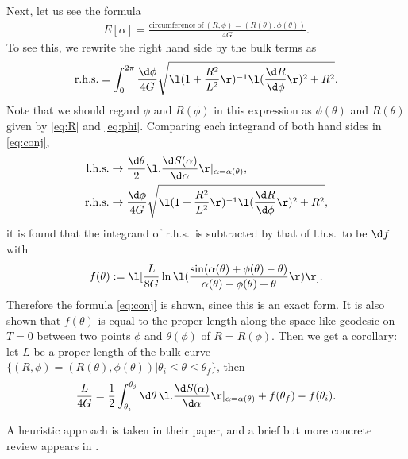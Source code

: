 \documentclass[12pt]{article}
\begin{document}
Next, let us see the formula
\begin{align}
	E[\alpha] = \frac{\mathrm{circumference~of~}(R,\phi) = (R(\theta),\phi(\theta))}{4G}.\label{eq:conj}
\end{align}
To see this, we rewrite the right hand side by the bulk terms as
\begin{align}
	\mathrm{r.h.s.} = \int_0^{2\pi} \frac{\d\phi}{4G}\sqrt{\l(1 + \frac{R^2}{L^2}\r)^{-1}\l(\frac{\d R}{\d \phi}\r)^2 + R^2}.
\end{align}
Note that we should regard $\phi$ and $R(\phi)$ in this expression as $\phi(\theta)$ and $R(\theta)$ given by \eqref{eq:R} and \eqref{eq:phi}.
Comparing each integrand of both hand sides in \eqref{eq:conj},
\begin{align}
	\mathrm{l.h.s.} &\rightarrow \frac{\d\theta}{2}\l.\frac{\d S(\alpha)}{\d\alpha}\r|_{\alpha = \alpha(\theta)},\\
	\mathrm{r.h.s.} &\rightarrow \frac{\d\phi}{4G}\sqrt{\l(1 + \frac{R^2}{L^2}\r)^{-1}\l(\frac{\d R}{\d \phi}\r)^2 + R^2},
\end{align}
it is found that the integrand of r.h.s.\ is subtracted by that of l.h.s.\ to be $\d f$ with
\begin{align}
	f(\theta) := \l[\frac{L}{8G}\ln\l(\frac{\sin(\alpha(\theta)+\phi(\theta)-\theta)}{\alpha(\theta)-\phi(\theta) + \theta} \r) \r].
\end{align}
Therefore the formula \eqref{eq:conj} is shown, since this is an exact form.
It is also shown that $f(\theta)$ is equal to the proper length along the space-like geodesic on $T=0$ between two points $\phi$ and $\theta(\phi)$ of $R = R(\phi)$.
Then we get a corollary: let $L$ be a proper length of the bulk curve $\{(R,\phi) = (R(\theta),\phi(\theta))|\theta_i\le\theta\le \theta_f\}$, then
\begin{align}
	\frac{L}{4G} = \frac{1}{2}\int_{\theta_i}^{\theta_j}\d\theta\,\l.\frac{\d S(\alpha)}{\d \alpha}\r|_{\alpha = \alpha(\theta)}  + f(\theta_f) - f(\theta_i).
\end{align}

A heuristic approach is taken in their paper, and a brief but more concrete review appears in \cite{Czech:2014ppa}.


































 

\end{document}

